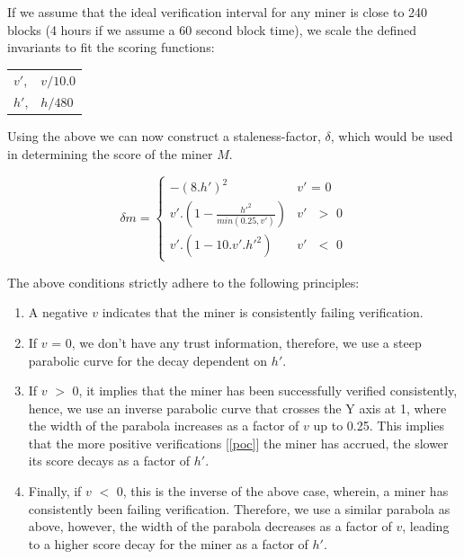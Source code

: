 \documentclass[10pt, nonatbib, nocopyrightspace, reprint]{sigplanconf}
\newcommand{\secref}[1]{[\autoref{#1}]}
\begin{document}
If we assume that the ideal verification interval for any miner is close to 240 blocks (4 hours if we assume a 60 second block time), we scale the defined invariants to fit the scoring functions:

\begin{tabular}{l l}
        $v'$, &$v/10.0$\\
        $h'$, &$h/480$ \\
\end{tabular}

Using the above we can now construct a staleness-factor, $\delta$, which would be used in determining the score of the miner $M$.

\begin{equation*} \label{equation:score1}
        \delta{m} = \begin{cases}
        	-(8.h')^{2}&\text{$v'$ = 0}\\
        	v'.(1 - \frac{h'^{2}}{min(0.25, v')})&\text{$v'$ $>$ 0}\\
        	v'.(1 - 10.v'.h'^{2})&\text{$v'$ $<$ 0}
        \end{cases}
\end{equation*}

The above conditions strictly adhere to the following principles:

\begin{enumerate}
  \item A negative $v$ indicates that the miner is consistently failing verification.

  \item If $v$ = 0, we don't have any trust information, therefore, we use a steep parabolic curve for the decay dependent on $h'$.

  \item If $v$ $>$ 0, it implies that the miner has been successfully verified consistently, hence, we use an inverse parabolic curve that crosses the Y axis at 1, where the width of the parabola increases as a factor of $v$ up to 0.25. This implies that the more positive verifications \secref{poc} the miner has accrued, the slower its score decays as a factor of $h'$.

  \item Finally, if $v$ $<$ 0, this is the inverse of the above case, wherein, a miner has consistently been failing verification. Therefore, we use a similar parabola as above, however, the width of the parabola decreases as a factor of $v$, leading to a higher score decay for the miner as a factor of $h'$.

\end{enumerate}
\end{document}
